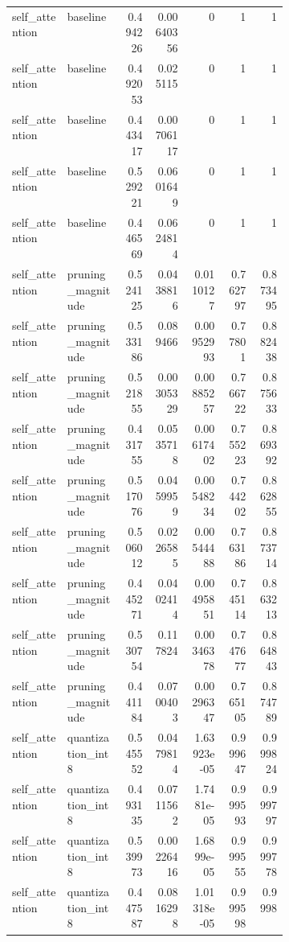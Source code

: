 \begin{landscape}
\begin{longtable}{@{}p{0.20\linewidth}p{0.20\linewidth}rrrrr@{}}
self\_\allowbreak{}attention & baseline & 0.494226 & 0.00640356 & 0 & 1 & 1 \\
self\_\allowbreak{}attention & baseline & 0.492053 & 0.025115 & 0 & 1 & 1 \\
self\_\allowbreak{}attention & baseline & 0.443417 & 0.00706117 & 0 & 1 & 1 \\
self\_\allowbreak{}attention & baseline & 0.529221 & 0.0601649 & 0 & 1 & 1 \\
self\_\allowbreak{}attention & baseline & 0.446569 & 0.0624814 & 0 & 1 & 1 \\
self\_\allowbreak{}attention & pruning\_\allowbreak{}magnitude & 0.524125 & 0.0438816 & 0.0110127 & 0.762797 & 0.873495 \\
self\_\allowbreak{}attention & pruning\_\allowbreak{}magnitude & 0.533186 & 0.089466 & 0.00952993 & 0.77801 & 0.882438 \\
self\_\allowbreak{}attention & pruning\_\allowbreak{}magnitude & 0.521855 & 0.00305329 & 0.00885257 & 0.766722 & 0.875633 \\
self\_\allowbreak{}attention & pruning\_\allowbreak{}magnitude & 0.431755 & 0.0535718 & 0.00617402 & 0.755223 & 0.869392 \\
self\_\allowbreak{}attention & pruning\_\allowbreak{}magnitude & 0.517076 & 0.0459959 & 0.00548234 & 0.744202 & 0.862855 \\
self\_\allowbreak{}attention & pruning\_\allowbreak{}magnitude & 0.506012 & 0.0226585 & 0.00544488 & 0.763186 & 0.873714 \\
self\_\allowbreak{}attention & pruning\_\allowbreak{}magnitude & 0.445271 & 0.0402414 & 0.00495851 & 0.745114 & 0.863213 \\
self\_\allowbreak{}attention & pruning\_\allowbreak{}magnitude & 0.530754 & 0.117824 & 0.00346378 & 0.747677 & 0.864843 \\
self\_\allowbreak{}attention & pruning\_\allowbreak{}magnitude & 0.441184 & 0.0700403 & 0.00296347 & 0.765105 & 0.874789 \\
self\_\allowbreak{}attention & quantization\_\allowbreak{}int8 & 0.545552 & 0.0479814 & 1.63923e-05 & 0.999647 & 0.999824 \\
self\_\allowbreak{}attention & quantization\_\allowbreak{}int8 & 0.493135 & 0.0711562 & 1.7481e-05 & 0.999593 & 0.999797 \\
self\_\allowbreak{}attention & quantization\_\allowbreak{}int8 & 0.539973 & 0.00226416 & 1.6899e-05 & 0.999555 & 0.999778 \\
self\_\allowbreak{}attention & quantization\_\allowbreak{}int8 & 0.447587 & 0.0816298 & 1.01318e-05 & 0.999598 & 0.9998 \\

\end{longtable}
\end{landscape}

